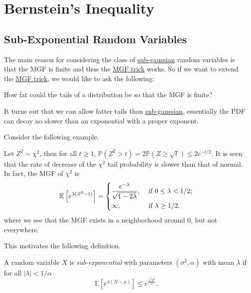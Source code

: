 \section{Bernstein's Inequality}
\subsection{Sub-Exponential Random Variables}
The main reason for considering the class of \hyperref[def:sub-gaussian]{sub-gaussian} random variables is that the MGF is finite and thus the \hyperref[lma:MGF-trick]{MGF trick} works. So if we want to extend the \hyperref[lma:MGF-trick]{MGF trick}, we would like to ask the following:

\begin{problem*}
	How fat could the tails of a distribution be so that the MGF is finite?
\end{problem*}
\begin{answer}
	It turns out that we can allow fatter tails than \hyperref[def:sub-gaussian]{sub-gaussian}, essentially the PDF can decay no slower than an exponential with a proper exponent.
\end{answer}

Consider the following example.

\begin{eg}
	Let \(Z^2 \sim \chi ^2\), then for all \(t \geq 1\), \(\mathbb{P} (Z^2 > t) = 2\mathbb{P} (Z \geq \sqrt{t} ) \leq 2 e^{-t / 2}\). It is seen that the rate of decrease of the \(\chi ^2\) tail probability is slower than that of normal. In fact, the MGF of \(\chi ^{2} \) is
	\[
		\mathbb{E}_{}\left[e^{\lambda (Z^2 - 1)} \right] =
		\begin{dcases}
			\frac{e^{-\lambda }}{\sqrt{1 - 2 \lambda } }, & \text{ if } 0 \leq \lambda < 1 / 2 ; \\
			\infty ,                                      & \text{ if } \lambda  \geq 1 / 2 ,
		\end{dcases}
	\]
	where we see that the MGF exists in a neighborhood around \(0\), but not everywhere.
\end{eg}

This motivates the following definition.

\begin{definition}\label{def:sub-exponential}
	A random variable \(X\) is \emph{sub-exponential} with parameters \((\sigma ^{2} , \alpha )\) with mean \(\lambda \) if for all \(\vert \lambda  \vert < 1 / \alpha \)
	\[
		\mathbb{E}_{}\left[e^{\lambda (X - \mu )} \right] \leq e^{\frac{\lambda ^{2} \sigma ^{2} }{2}}.
	\]
\end{definition}

